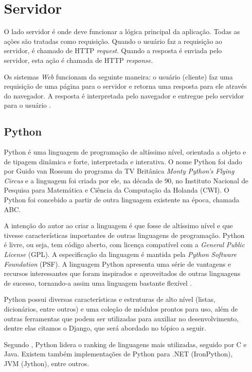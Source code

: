 \documentclass[
	12pt,				%
    oneside,			%
	a4paper,			%
	english,			%
	french,				%
	spanish,			%
	brazil,				%
	]{abntex2}
\begin{document}
\section{Servidor}

O lado servidor é onde deve funcionar a lógica principal da aplicação. Todas as
ações são tratadas como requisição. Quando o usuário faz a requisição ao servidor,
é chamado de HTTP \textit{request}. Quando a resposta é enviada pelo servidor, esta ação
é chamada de HTTP \textit{response}.

Os sistemas \textit{Web} funcionam da seguinte maneira: o usuário (cliente) faz uma
requisição de uma página para o servidor e retorna uma resposta para ele através do
navegador. A resposta é interpretada pelo navegador e entregue pelo servidor para o
usuário \cite{niederauer}.

\subsection{Python}

Python é uma linguagem de programação de altíssimo nível, orientada a objeto
e de tipagem dinâmica e forte, interpretada e interativa. O nome Python foi dado por
Guido van Rossum do programa da TV Britânica \textit{Monty Python’s Flying Circus} e a
linguagem foi criada por ele, na década de 90, no Instituto Nacional de Pesquisa para
Matemática e Ciência da Computação da Holanda (CWI). O Python foi concebido a
partir de outra linguagem existente na época, chamada ABC.

A intenção do autor ao criar a linguagem é que fosse de altíssimo nível e que
tivesse características importantes de outras linguagens de programação. Python é
livre, ou seja, tem código aberto, com licença compatível com a \textit{General Public License}
(GPL). A especificação da linguagem é mantida pela \textit{\textit{Python Software Foundation}}
(PSF). A linguagem Python apresenta uma série de vantagens e recursos
interessantes que foram inspirados e aproveitados de outras linguagens de sucesso,
tornando-a assim uma linguagem bastante flexível \cite{borges}.

Python possui diversas características e estruturas de alto nível (listas,
dicionários, entre outros) e uma coleção de módulos prontos para uso, além de outras
ferramentas que podem ser utilizadas para auxiliar no desenvolvimento, dentre elas
citamos o Django, que será abordado no tópico a seguir.

Segundo , Python lidera o ranking de linguagens
mais utilizadas, seguido por C e Java. Existem também implementações de Python
para .NET (IronPython), JVM (Jython), entre outros.
\end{document}
